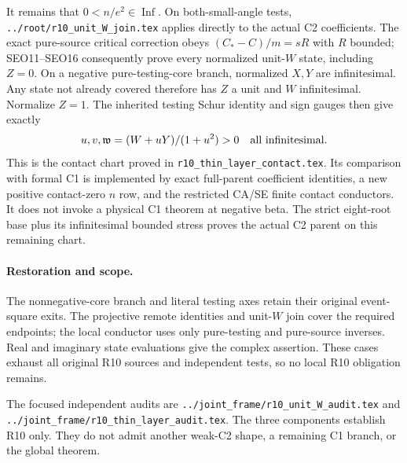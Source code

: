 It remains that $0<n/e^2\in\operatorname{Inf}$. On both-small-angle
tests, \texttt{../root/r10\_unit\_W\_join.tex} applies directly to the
actual C2 coefficients. The exact pure-source critical correction
obeys $(C_*-C)/m=sR$ with $R$ bounded; SEO11--SEO16 consequently
prove every normalized unit-$W$ state, including $Z=0$.
On a negative pure-testing-core branch, normalized $X,Y$ are
infinitesimal. Any state not already covered therefore has $Z$ a
unit and $W$ infinitesimal. Normalize $Z=1$. The inherited testing
Schur identity and sign gauges then give exactly
\[
 u,v,\mathfrak w=(W+uY)/(1+u^2)>0
                 \quad\hbox{all infinitesimal}.
\]
This is the contact chart proved in
\texttt{r10\_thin\_layer\_contact.tex}. Its comparison with formal C1
is implemented by exact full-parent coefficient identities, a new
positive contact-zero $n$ row, and the restricted CA/SE finite
contact conductors. It does not invoke a physical C1 theorem at
negative beta. The strict eight-root base plus its infinitesimal
bounded stress proves the actual C2 parent on this remaining chart.

\paragraph{Restoration and scope.}
The nonnegative-core branch and literal testing axes retain their
original event-square exits. The projective remote identities and
unit-$W$ join cover the required endpoints; the local conductor
uses only pure-testing and pure-source inverses. Real and imaginary
state evaluations give the complex assertion. These cases exhaust
all original R10 sources and independent tests, so no local R10
obligation remains.

The focused independent audits are
\texttt{../joint\_frame/r10\_unit\_W\_audit.tex} and
\texttt{../joint\_frame/r10\_thin\_layer\_audit.tex}.
The three components establish R10 only. They do not admit another
weak-C2 shape, a remaining C1 branch, or the global theorem.
